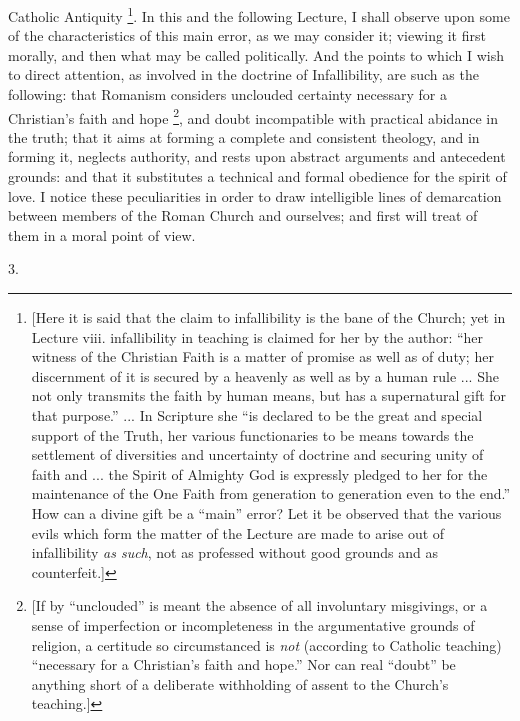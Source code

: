 Catholic Antiquity \footnote{[Here it is said that the claim to
infallibility is the bane of the Church; yet in Lecture viii.
infallibility in teaching is claimed for her by the author: ``her
witness of the Christian Faith is a matter of promise as well as of
duty; her discernment of it is secured by a heavenly as well as by a
human rule ... She not only transmits the faith by human means, but
has a supernatural gift for that purpose.'' ... In Scripture she
``is declared to be the great and special support of the Truth,
her various functionaries to be means towards the settlement of
diversities and uncertainty of doctrine and securing unity of faith
and ... the Spirit of Almighty God is expressly pledged to her for the
maintenance of the One Faith from generation to generation even to the
end.'' How can a divine gift be a ``main'' error? Let it
be observed that the various evils which form the matter of the
Lecture are made to arise out of infallibility \emph{as such}, not as
professed without good grounds and as counterfeit.]}. In
this and the following Lecture, I shall observe upon some of the
characteristics of this main error, as we may consider it; viewing it
first morally, and then what may be called politically. And the points
to which I wish to direct attention, as involved in the doctrine of
Infallibility, are such as the following: that Romanism considers
unclouded certainty necessary for a Christian's faith and hope \footnote{[If by ``unclouded'' is meant the
absence of all involuntary misgivings, or a sense of imperfection or
incompleteness in the argumentative grounds of religion, a certitude
so circumstanced is \emph{not} (according to Catholic teaching)
``necessary for a Christian's faith and hope.'' Nor can real
``doubt'' be anything short of a deliberate withholding of
assent to the Church's teaching.]}, and doubt incompatible with practical abidance in the truth;
that it aims at forming a complete and consistent theology, and in
forming it, neglects authority, and rests upon abstract arguments and
antecedent grounds: and that it substitutes a technical and formal
obedience for the spirit of love. I notice these peculiarities in
order to draw intelligible lines of demarcation between members of the
Roman Church and ourselves; and first will treat of them in a moral
point of view.

3.

